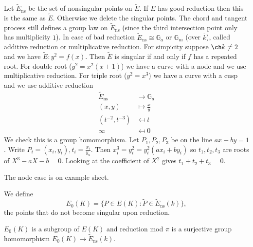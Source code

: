 \documentclass[a4paper]{article}
\theoremstyle{definition}
\theoremstyle{theorem}
\begin{document}
Let \(\widetilde E_{\mathrm{ns}}\) be the set of nonsingular points on \(\widetilde E\). If \(E\) has good reduction then this is the same as \(\widetilde E\). Otherwise we delete the singular points. The chord and tangent process still defines a group law on \(\widetilde E_{\mathrm{ns}}\) (since the third intersection point only has multiplicity \(1\)). In case of bad reduction \(\widetilde E_{\mathrm{ns}} \cong \mathbb G_a\) or \(\mathbb G_m\) (over \(\overline k\)), called additive reduction or multiplicative reduction. For simpicity suppose \(\ch k \neq 2\) and we have \(\widetilde E: y^2 = f(x)\). Then \(\widetilde E\) is singular if and only if \(f\) has a repeated root. For double root (\(y^2 = x^2(x + 1)\)) we have a curve with a node and we use multiplicative reduction. For triple root (\(y^2 = x^3\)) we have a curve with a cusp and we use additive reduction
\begin{align*}
  \widetilde E_{\mathrm{ns}} &\to \mathbb G_a \\
  (x, y) &\mapsto \frac{x}{y} \\
  (t^{-2}, t^{-3}) &\mapsfrom t \\
  \infty &\mapsfrom 0
\end{align*}
We check this is a group homomorphism. Let \(P_1, P_2, P_3\) be on the line \(ax + by = 1\). Write \(P_i = (x_i, y_i), t_i = \frac{x_i}{y_u}\). Then \(x_i^3 = y_i^2 = y_i^2(ax_i + by_i)\) so \(t_1, t_2, t_3\) are roots of \(X^3 - aX - b = 0\). Looking at the coefficient of \(X^2\) gives \(t_1 + t_2 + t_3 = 0\).

The node case is on example sheet.

\begin{definition}
  We define
  \[
    E_0(K) = \{P \in E(K): \widetilde P \in \widetilde E_{\mathrm{ns}}(k)\},
  \]
  the points that do not become singular upon reduction.
\end{definition}

\begin{proposition}
  \(E_0(K)\) is a subgroup of \(E(K)\) and reduction mod \(\pi\) is a surjective group homomorphism \(E_0(K) \to \widetilde E_{\mathrm{ns}}(k)\).
\end{proposition}
\end{document}
